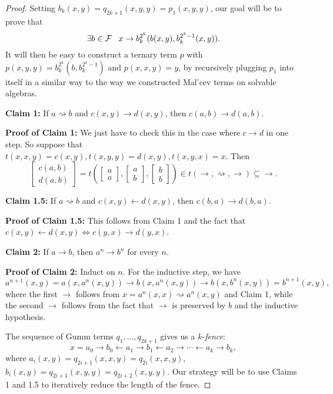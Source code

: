 \begin{appendices}
\begin{proof}
Setting $b_k(x,y) = q_{2k+1}(x,y,y) = p_1(x,y,y)$, our goal will be to prove that
\[
\exists b \in \mathcal{F}\;\;\; x \rightarrow b_k^{2^k}(b(x,y),b_k^{2^k-1}(x,y)).
\]
It will then be easy to construct a ternary term $p$ with $p(x,y,y) = b_k^{2^k}(b,b_k^{2^k-1})$ and $p(x,x,y) = y$, by recursively plugging $p_1$ into itself in a similar way to the way we constructed Mal'cev terms on solvable algebras.

{\bf Claim 1:} If $a \rightsquigarrow b$ and $c(x,y) \rightarrow d(x,y)$, then $c(a,b) \rightarrow d(a,b)$.

{\bf Proof of Claim 1:} We just have to check this in the case where $c \rightarrow d$ in one step. So suppose that $t(x,x,y) = c(x,y), t(x,y,y) = d(x,y), t(x,y,x) = x$. Then
\[
\begin{bmatrix} c(a,b)\\ d(a,b)\end{bmatrix} = t\left(\begin{bmatrix} a\\ a\end{bmatrix}, \begin{bmatrix} a\\ b\end{bmatrix}, \begin{bmatrix} b\\ b\end{bmatrix}\right) \in t(\rightarrow,\rightsquigarrow,\rightarrow) \subseteq \rightarrow.
\]

{\bf Claim 1.5:} If $a \rightsquigarrow b$ and $c(x,y) \leftarrow d(x,y)$, then $c(b,a) \rightarrow d(b,a)$.

{\bf Proof of Claim 1.5:} This follows from Claim 1 and the fact that $c(x,y) \leftarrow d(x,y) \iff c(y,x) \rightarrow d(y,x)$.

{\bf Claim 2:} If $a \rightarrow b$, then $a^n \rightarrow b^n$ for every $n$.

{\bf Proof of Claim 2:} Induct on $n$. For the inductive step, we have
\[
a^{n+1}(x,y) = a(x,a^n(x,y)) \rightarrow b(x,a^n(x,y)) \rightarrow b(x,b^n(x,y)) = b^{n+1}(x,y),
\]
where the first $\rightarrow$ follows from $x = a^n(x,x) \rightsquigarrow a^n(x,y)$ and Claim 1, while the second $\rightarrow$ follows from the fact that $\rightarrow$ is preserved by $b$ and the inductive hypothesis.

The sequence of Gumm terms $q_1, ..., q_{2k+1}$ gives us a $k$-\emph{fence}:
\[
x = a_0 \rightarrow b_0 \leftarrow a_1 \rightarrow b_1 \leftarrow a_2 \rightarrow \cdots \leftarrow a_k \rightarrow b_k,
\]
where $a_i(x,y) = q_{2i+1}(x,x,y) = q_{2i}(x,x,y)$, $b_i(x,y) = q_{2i+1}(x,y,y) = q_{2i+2}(x,y,y)$. Our strategy will be to use Claims 1 and 1.5 to iteratively reduce the length of the fence.


\end{proof}
\end{appendices}
